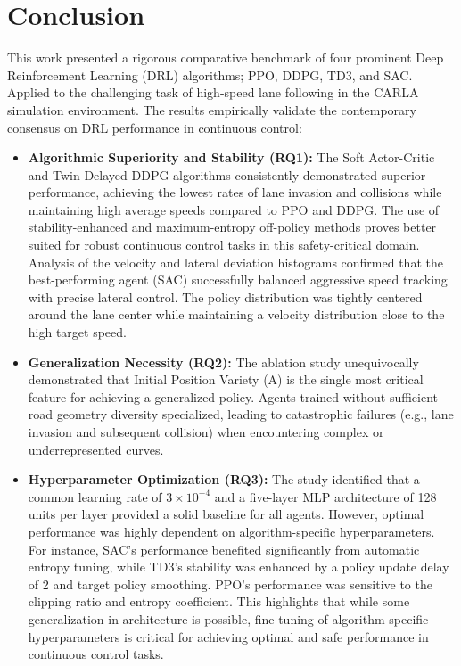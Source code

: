 \documentclass[]{interact}
\begin{document}
\section{Conclusion}
\label{sec:conclusion}

This work presented a rigorous comparative benchmark of four prominent Deep Reinforcement Learning (DRL) algorithms; PPO, DDPG, TD3, and SAC. Applied to the challenging task of high-speed lane following in the CARLA simulation environment. The results empirically validate the contemporary consensus on DRL performance in continuous control:

\begin{itemize}
    \item \textbf{Algorithmic Superiority and Stability (RQ1):} The Soft Actor-Critic  and Twin Delayed DDPG algorithms consistently demonstrated superior performance, achieving the lowest rates of lane invasion and collisions while maintaining high average speeds compared to PPO and DDPG. The use of stability-enhanced and maximum-entropy off-policy methods proves better suited for robust continuous control tasks in this safety-critical domain. Analysis of the velocity and lateral deviation histograms confirmed that the best-performing agent (SAC) successfully balanced aggressive speed tracking with precise lateral control. The policy distribution was tightly centered around the lane center while maintaining a velocity distribution close to the high target speed.
    \item \textbf{Generalization Necessity (RQ2):} The ablation study unequivocally demonstrated that Initial Position Variety (A) is the single most critical feature for achieving a generalized policy. Agents trained without sufficient road geometry diversity specialized, leading to catastrophic failures (e.g., lane invasion and subsequent collision) when encountering complex or underrepresented curves.
    \item \textbf{Hyperparameter Optimization (RQ3):} The study identified that a common learning rate of $3 \times 10^{-4}$ and a five-layer MLP architecture of 128 units per layer provided a solid baseline for all agents. However, optimal performance was highly dependent on algorithm-specific hyperparameters. For instance, SAC’s performance benefited significantly from automatic entropy tuning, while TD3’s stability was enhanced by a policy update delay of 2 and target policy smoothing. PPO’s performance was sensitive to the clipping ratio and entropy coefficient. This highlights that while some generalization in architecture is possible, fine-tuning of algorithm-specific hyperparameters is critical for achieving optimal and safe performance in continuous control tasks.
\end{itemize}
\end{document}
